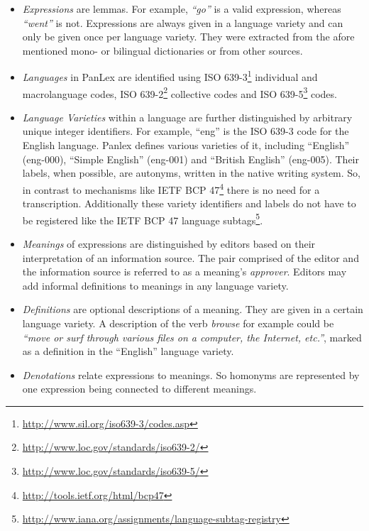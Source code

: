 \documentclass[sw]{iosart2c}
\begin{document}
\begin{itemize}
  \item \emph{Expressions} are lemmas. For example, \emph{``go''} is a valid expression, whereas \emph{``went''} is not.
  Expressions are always given in a language variety and can only be given once per language variety.
  They were extracted from the afore mentioned mono- or bilingual dictionaries or from other sources.
  \item \emph{Languages} in PanLex are identified using ISO 639-3\footnote{\url{http://www.sil.org/iso639-3/codes.asp}} individual and macrolanguage codes, ISO 639-2\footnote{\url{http://www.loc.gov/standards/iso639-2/}} collective codes and ISO 639-5\footnote{\url{http://www.loc.gov/standards/iso639-5/}} codes.
  \item \emph {Language Varieties} within a language are further distinguished by arbitrary unique integer identifiers.
  For example, ``eng'' is the ISO 639-3 code for the English language.
  Panlex defines various varieties of it, including ``English'' (eng-000), ``Simple English'' (eng-001) and ``British English'' (eng-005).
  Their labels, when possible, are autonyms, written in the native writing system.
  So, in contrast to mechanisms like IETF BCP 47\footnote{\url{http://tools.ietf.org/html/bcp47}} there is no need for a transcription. %
  Additionally these variety identifiers and labels do not have to be registered like the IETF BCP 47 language subtags\footnote{\url{http://www.iana.org/assignments/language-subtag-registry}}.
  \item \emph{Meanings} of expressions are distinguished by editors based on their
  interpretation of an information source.
  The pair comprised of the editor and the information source is referred to as a meaning's \emph{approver}.
  Editors may add informal definitions to meanings in any language variety.
  \item \emph{Definitions} are optional descriptions of a meaning.
  They are given in a certain language variety.
  A description of the verb \emph{browse} for example could be \emph{``move or surf through various files on a computer, the Internet, etc.''}, marked as a definition in the ``English'' language variety.
  \item \emph{Denotations} relate expressions to meanings.
  So homonyms are represented by one expression being connected to different meanings.

\end{itemize}
\end{document}
